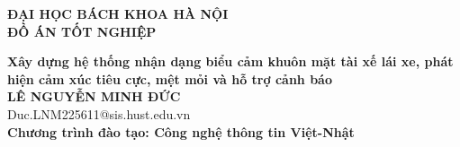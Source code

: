 \documentclass[DoAn.tex]{subfiles}
\begin{document}
\begin{titlepage}
\thispagestyle{empty}
\begin{center}

{\textbf{\large{ĐẠI HỌC BÁCH KHOA HÀ NỘI}}}\\[4cm]

{\textbf{\huge{ ĐỒ ÁN TỐT NGHIỆP}}}\\[1cm]
{\textbf{\Large{Xây dựng hệ thống nhận dạng biểu cảm khuôn mặt tài xế lái xe, phát hiện cảm xúc tiêu cực, mệt mỏi và hỗ trợ cảnh báo}}\\[1cm]

{\textbf{\large{LÊ NGUYỄN MINH ĐỨC}}}\\
{\large{Duc.LNM225611@sis.hust.edu.vn}}\\[0.5cm]

{\textbf{\large{Chương trình đào tạo: Công nghệ thông tin Việt-Nhật
}}}\\

\vspace{4cm}
\begin{table}[H]
\centering
{}
\end{table}}
\end{center}



\end{titlepage}
\end{document}

